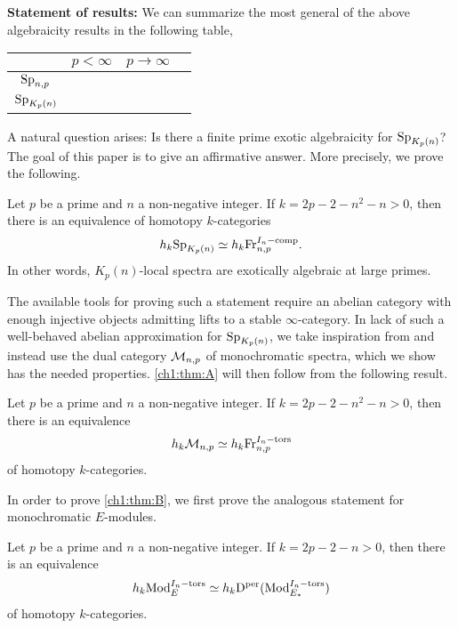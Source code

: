\textbf{Statement of results:} We can summarize the most general of the above algebraicity results in the following table,

\begin{table}[h]
    \centering
    \begin{tabular}{c|ccc}
        & $p<\infty $ & $p\rightarrow \infty$ \\
        \hline 
        $\mathrm{Sp}_{n,p}$& \cite{patchkoria-pstragowski_2021} & \cite{barthel-schlank-stapleton_2020} \\
        $\mathrm{Sp}_{{K_p(n)}}$ &  & \cite{barthel-schlank-stapleton_2021} 
    \end{tabular}
\end{table}

A natural question arises: Is there a finite prime exotic algebraicity for $\mathrm{Sp}_{{K_p(n)}}$? The goal of this paper is to give an affirmative answer. More precisely, we prove the following. 

\begin{introthm}
    \label{ch1:thm:A}
    Let $p$ be a prime and $n$ a non-negative integer. If $k=2p-2-n^2-n>0$, then there is an equivalence of homotopy $k$-categories 
    \[h_k \mathrm{Sp}_{{K_p(n)}}\simeq h_k \mathrm{Fr}_{n,p}^{I_n-\mathrm{comp}}.\]
    In other words, $K_p(n)$-local spectra are exotically algebraic at large primes. 
\end{introthm}

The available tools for proving such a statement require an abelian category with enough injective objects admitting lifts to a stable $\infty$-category. In lack of such a well-behaved abelian approximation for $\mathrm{Sp}_{{K_p(n)}}$, we take inspiration from \cite{barthel-schlank-stapleton_2021} and instead use the dual category $\mathcal{M}_{n,p}$ of monochromatic spectra, which we show has the needed properties. \cref{ch1:thm:A} will then follow from the following result. 

\begin{introthm}
    \label{ch1:thm:B}
    Let $p$ be a prime and $n$ a non-negative integer. If $k=2p-2-n^2-n>0$,  then there is an equivalence 
    \[h_k \mathcal{M}_{n,p}\simeq h_k \mathrm{Fr}_{n,p}^{I_n-\mathrm{tors}}\]
    of homotopy $k$-categories.
\end{introthm}

In order to prove \cref{ch1:thm:B}, we first prove the analogous statement for monochromatic $E$-modules. 
    
\begin{introthm}
    \label{ch1:thm:C}
    Let $p$ be a prime and $n$ a non-negative integer. If $k=2p-2-n>0$,  then there is an equivalence
    \[h_k \mathrm{Mod}_{E}^{I_n-\mathrm{tors}}\simeq h_k \mathrm{D}^{\mathrm{per}}(\mathrm{Mod}_{E_*}^{I_n-\mathrm{tors}})\]
    of homotopy $k$-categories.
\end{introthm}


